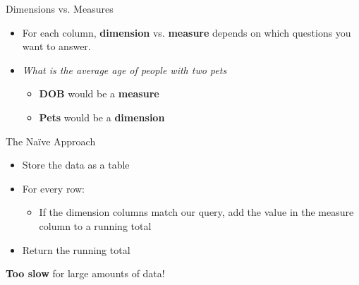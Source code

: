 \documentclass{beamer}
\theoremstyle{definition}
\theoremstyle{definition}
\begin{document}
\begin{frame}{Dimensions vs. Measures}
    \begin{itemize}
        \item<+-> For each column, \textbf{dimension} vs. \textbf{measure} depends on which questions you want to answer.
        \item<+-> \textit{What is the average age of people with two pets}
        \pause
        \begin{itemize}
            \item \textbf{DOB} would be a \textbf{measure}
            \item \textbf{Pets} would be a \textbf{dimension}
        \end{itemize}
    \end{itemize}
\end{frame}

\begin{frame}{The Na\"{i}ve Approach}
    \begin{itemize}
        \item Store the data as a table
        \item For every row:
        \begin{itemize}
            \item If the dimension columns match our query, add the value in the measure column to a running total
        \end{itemize}
        \item Return the running total
    \end{itemize}
    \pause
    \textbf{Too slow} for large amounts of data!
\end{frame}
\end{document}
